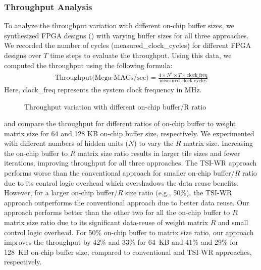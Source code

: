 {{{{\subsubsection{Throughput Analysis}
To analyze the throughput variation with different on-chip buffer sizes, we synthesized FPGA designs () with varying buffer sizes for all three approaches. We recorded the number of cycles (measured\_clock\_cycles) for different FPGA designs over $T$ time steps to evaluate the throughput. Using this data, we computed the throughput using the following formula:
\begin{align}\label{eq:througput}
	\text{Throughput(Mega-MACs/sec)}=\frac{4{\times}N^2{\times}T{\times}{\text {clock\_freq}}}{\text{measured\_clock\_cycles}}
\end{align}
Here, clock\_freq represents the system clock frequency in MHz.
\begin{figure}[htb!]
	\centering
	\hspace{2.0em}
	\caption{Throughput variation with different on-chip buffer/R ratio}	\label{fig:throughputVsMem}
\end{figure}
 and  compare the throughput for different ratios of on-chip buffer to weight matrix size for 64 and 128 KB on-chip buffer size, respectively. We experimented with different numbers of hidden units ($N$) to vary the $R$ matrix size. Increasing the on-chip buffer to $R$ matrix size ratio results in larger tile sizes and fewer iterations, improving throughput for all three approaches. The TSI-WR approach performs worse than the conventional approach for smaller on-chip buffer/$R$ ratio due to its control logic overhead which overshadows the data reuse benefits. However, for a larger on-chip buffer/$R$ size ratio (e.g., 50\%), the TSI-WR approach outperforms the conventional approach due to better data reuse. Our approach performs better than the other two for all the on-chip buffer to $R$ matrix size ratio due to its significant data-reuse of weight matrix $R$ and small control logic overhead.
For 50\% on-chip buffer to matrix size ratio, our approach improves the throughput by 42\% and 33\% for 64~KB and 41\% and 29\% for 128~KB on-chip buffer size, compared to conventional and TSI-WR approaches, respectively.
}}}}
